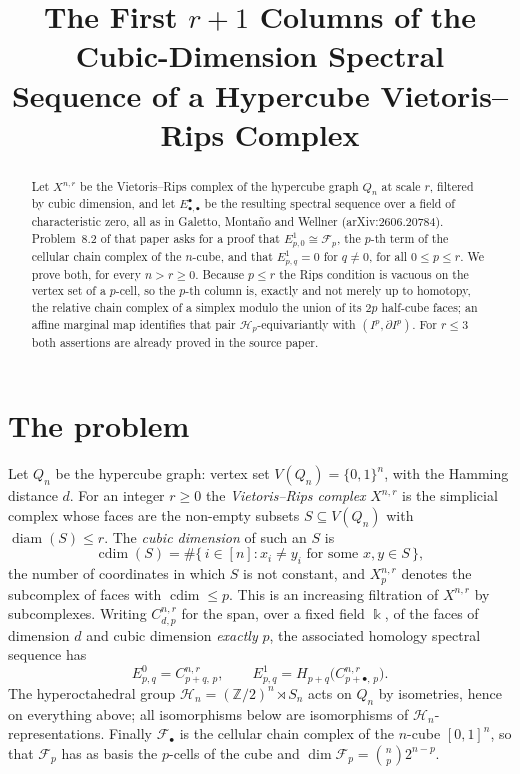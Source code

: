 \documentclass[11pt]{amsart}
\title[The first $r+1$ columns of a hypercube Rips spectral sequence]
{The First $r+1$ Columns of the Cubic-Dimension Spectral Sequence
 of a Hypercube Vietoris--Rips Complex}
\date{}
\theoremstyle{definition}
\theoremstyle{remark}
\DeclareMathOperator{\diam}{diam}
\DeclareMathOperator{\cdim}{cdim}
\newcommand{\kk}{\Bbbk}
\newcommand{\Hy}{\mathcal H}
\newcommand{\Fc}{\mathcal F}
\newcommand{\bl}{\bullet}
\numberwithin{equation}{section}
\begin{document}
\begin{abstract}
Let $X^{n,r}$ be the Vietoris--Rips complex of the hypercube graph $Q_n$ at
scale $r$, filtered by cubic dimension, and let $E^\bl_{\bl,\bl}$ be the
resulting spectral sequence over a field of characteristic zero, all as in
Galetto, Monta\~no and Wellner (arXiv:2606.20784). Problem~8.2 of that paper
asks for a proof that $E^1_{p,0}\cong\Fc_p$, the $p$-th term of the cellular
chain complex of the $n$-cube, and that $E^1_{p,q}=0$ for $q\neq0$, for all
$0\le p\le r$. We prove both, for every $n>r\ge0$. Because $p\le r$ the Rips
condition is vacuous on the vertex set of a $p$-cell, so the $p$-th column is,
exactly and not merely up to homotopy, the relative chain complex of a simplex
modulo the union of its $2p$ half-cube faces; an affine marginal map identifies
that pair $\Hy_p$-equivariantly with $(I^p,\partial I^p)$. For $r\le3$ both
assertions are already proved in the source paper.
\end{abstract}

\maketitle

\section{The problem}\label{sec:problem}

Let $Q_n$ be the hypercube graph: vertex set $V(Q_n)=\{0,1\}^n$, with the
Hamming distance $d$. For an integer $r\ge0$ the \emph{Vietoris--Rips complex}
$X^{n,r}$ is the simplicial complex whose faces are the non-empty subsets
$S\subseteq V(Q_n)$ with $\diam(S)\le r$. The \emph{cubic dimension} of such an
$S$ is
\[
  \cdim(S)=\#\{\,i\in[n] : \text{$x_i\neq y_i$ for some $x,y\in S$}\,\},
\]
the number of coordinates in which $S$ is not constant, and $X^{n,r}_p$ denotes
the subcomplex of faces with $\cdim\le p$. This is an increasing filtration of
$X^{n,r}$ by subcomplexes. Writing $C^{n,r}_{d,p}$ for the span, over a fixed
field $\kk$, of the faces of dimension $d$ and cubic dimension \emph{exactly}
$p$, the associated homology spectral sequence has
\[
  E^0_{p,q}=C^{n,r}_{p+q,\,p},
  \qquad
  E^1_{p,q}=H_{p+q}\bigl(C^{n,r}_{p+\bl,\,p}\bigr).
\]
The hyperoctahedral group $\Hy_n=(\mathbb Z/2)^n\rtimes S_n$ acts on $Q_n$ by
isometries, hence on everything above; all isomorphisms below are isomorphisms
of $\Hy_n$-representations. Finally $\Fc_\bl$ is the cellular chain complex of
the $n$-cube $[0,1]^n$, so that $\Fc_p$ has as basis the $p$-cells of the cube
and $\dim\Fc_p=\binom{n}{p}2^{n-p}$.
\end{document}

